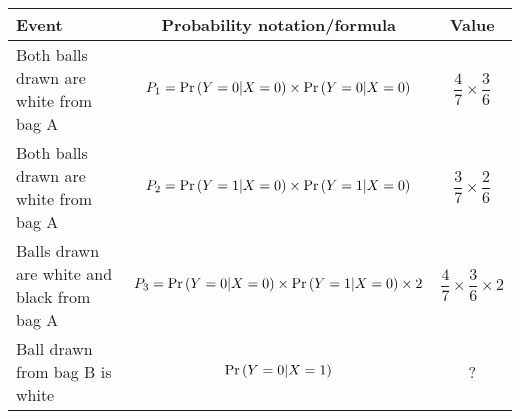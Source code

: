 \begin{tabular}{|l|c|c|}

\hline
\textbf{Event} & \textbf{Probability notation/formula} & \textbf{Value} \\
\hline
Both balls drawn are white from bag A & $P_1 = \Pr\left(Y=0|X=0\right)\times\Pr\left(Y=0|X=0\right)$ & $\dfrac{4}{7}\times\dfrac{3}{6}$\\ 
\hline
Both balls drawn are white from bag A & $P_2 = \Pr\left(Y=1|X=0\right)\times\Pr\left(Y=1|X=0\right)$ & $\dfrac{3}{7}\times\dfrac{2}{6}$\\ 
\hline
Balls drawn are white and black from bag A & $P_3 = \Pr\left(Y=0|X=0\right)\times\Pr\left(Y=1|X=0\right)\times2$ & $\dfrac{4}{7}\times\dfrac{3}{6}\times2$\\ 
\hline
Ball drawn from bag B is white & $\Pr\left(Y=0|X=1\right)$  & ?\\ 
\hline
\end{tabular}